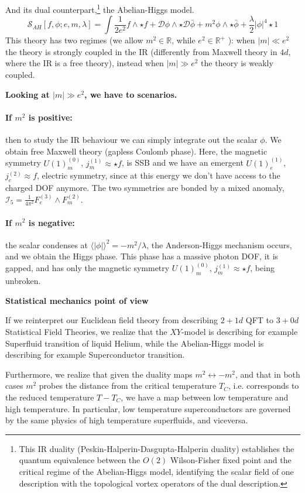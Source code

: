 \documentclass[aps,preprint,nofootinbib,preprintnumbers,eqsecnum,superscriptaddress]{revtex4}
\numberwithin{equation}{section}
\begin{document}
And its dual counterpart,\footnote{This IR duality (Peskin-Halperin-Dasgupta-Halperin duality) establishes the quantum equivalence between the $O(2)$ Wilson-Fisher fixed point and the critical regime of the Abelian-Higgs model, identifying the scalar field of one description with the topological vortex operators of the dual description.} the Abelian-Higgs model.
\begin{equation}
    \mathcal{S}_{AH}[f,\phi;e,m,\lambda] = \int  \frac{1}{2 e^2} f \wedge \star f + \mathcal{D} \phi \wedge \star \mathcal{D} \bar \phi + m^2 \phi \wedge  \star \bar \phi + \frac{\lambda}{2}  |\phi|^4  \star 1 
\end{equation}
This theory has two regimes (we allow $m^2 \in \mathbb{R}$, while $e^2 \in \mathbb{R}^+$ ): when $|m| \ll e^2$ the theory is strongly coupled in the IR (differently from Maxwell theory in $4d$, where the IR is a free theory), instead when $|m| \gg e^2$ the theory is weakly coupled.

{\bf Looking at $|m| \gg e^2$, we have to scenarios.}

\paragraph*{If $m^2$ is positive:} then to study the IR behaviour we can simply integrate out the scalar $\phi$. We obtain free Maxwell theory (gapless Coulomb phase). Here, the magnetic symmetry $U(1)^{(0)}_m$, $j^{(1)}_m \approx \star f$, is SSB and we have an emergent $U(1)^{(1)}_e$, $j^{(2)}_e \approx  f$, electric symmetry, since at this energy we don't have access to the charged DOF anymore. The two symmetries are bonded by a mixed anomaly, $\mathcal{I}_5 =  \frac{1}{4\pi^2} F^{(3)}_e \wedge F^{(2)}_m$.

\paragraph*{If $m^2$ is negative:} the scalar condenses at $\langle |\phi| \rangle^2 = -m^2/\lambda$, the Anderson-Higgs mechanism occurs, and we obtain the Higgs phase. This phase has a massive photon DOF, it is gapped, and has only the magnetic symmetry $U(1)^{(0)}_m$, $j^{(1)}_m \approx \star f$, being unbroken.

\begin{tcolorbox}
    {\bf Statistical mechanics point of view}

    If we reinterpret our Euclidean field theory from describing $2+1d$ QFT to $3+0d$ Statistical Field Theories, we realize that the $XY$-model is describing for example Superfluid transition of liquid Helium, while the Abelian-Higgs model is describing for example Superconductor transition.

    Furthermore, we realize that given the duality maps $m^2 \leftrightarrow -m^2$, and that in both cases $m^2$ probes the distance from the critical temperature $T_C$, i.e. corresponds to the reduced temperature $T-T_C$, we have a map between low temperature and high temperature. In particular, low temperature superconductors are governed by the same physics of high temperature superfluids, and viceversa.
\end{tcolorbox}
\end{document}
